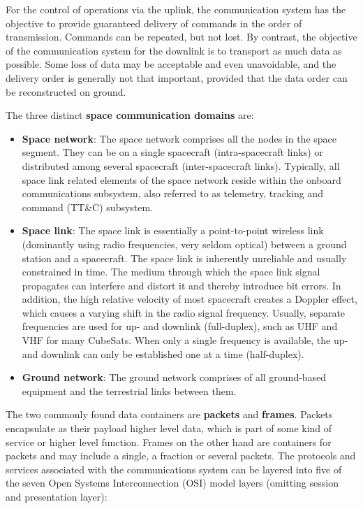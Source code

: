For the control of operations via the uplink, the communication system has the objective to provide guaranteed delivery of commands in the order of transmission. Commands can be repeated, but not lost. By contrast, the objective of the communication system for the downlink is to transport as much data as possible. Some loss of data may be acceptable and even unavoidable, and the delivery order is generally not that important, provided that the data order can be reconstructed on ground.

The three distinct \textbf{space communication domains} are:

\begin{itemize}
\item \textbf{Space network}: The space network comprises all the nodes in the space segment. They can be on a single spacecraft (intra-spacecraft links) or distributed among several spacecraft (inter-spacecraft links). Typically, all space link related elements of the space network reside within the onboard communications subsystem, also referred to as telemetry, tracking and command (TT\&C) subsystem.
\item \textbf{Space link}: The space link is essentially a point-to-point wireless link (dominantly using radio frequencies, very seldom optical) between a ground station and a spacecraft. The space link is inherently unreliable and usually constrained in time. The medium through which the space link signal propagates can interfere and distort it and thereby introduce bit errors. In addition, the high relative velocity of most spacecraft creates a Doppler effect, which causes a varying shift in the radio signal frequency. Usually, separate frequencies are used for up- and downlink (full-duplex), such as UHF and VHF for many CubeSats. When only a single frequency is available, the up- and downlink can only be established one at a time (half-duplex).
\item \textbf{Ground network}: The ground network comprises of all ground-based equipment and the terrestrial links between them.
\end{itemize}

The two commonly found data containers are \textbf{packets} and \textbf{frames}. Packets encapsulate as their payload higher level data, which is part of some kind of service or higher level function. Frames on the other hand are containers for packets and may include a single, a fraction or several packets. The protocols and services associated with the communications system can be layered into five of the seven Open Systems Interconnection (OSI) model layers (omitting session and presentation layer):

